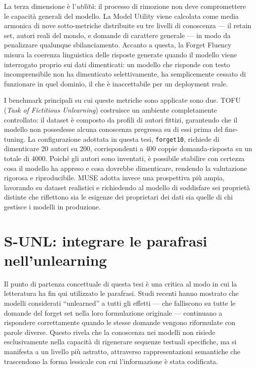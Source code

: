 \documentclass[12pt,a4paper]{article}
\begin{document}
La terza dimensione è l'\emph{utilità}: il processo di rimozione non deve compromettere le capacità generali del modello. La Model Utility viene calcolata come media armonica di nove sotto-metriche distribuite su tre livelli di conoscenza — il retain set, autori reali del mondo, e domande di carattere generale — in modo da penalizzare qualunque sbilanciamento. Accanto a questa, la Forget Fluency misura la coerenza linguistica delle risposte generate quando il modello viene interrogato proprio sui dati dimenticati: un modello che risponde con testo incomprensibile non ha dimenticato selettivamente, ha semplicemente cessato di funzionare in quel dominio, il che è inaccettabile per un deployment reale.

I benchmark principali su cui queste metriche sono applicate sono due. TOFU (\emph{Task of Fictitious Unlearning}) costruisce un ambiente completamente controllato: il dataset è composto da profili di autori fittizi, garantendo che il modello non possedesse alcuna conoscenza pregressa su di essi prima del fine-tuning. La configurazione adottata in questa tesi, \texttt{forget10}, richiede di dimenticare 20 autori su 200, corrispondenti a 400 coppie domanda-risposta su un totale di 4000. Poiché gli autori sono inventati, è possibile stabilire con certezza cosa il modello ha appreso e cosa dovrebbe dimenticare, rendendo la valutazione rigorosa e riproducibile. MUSE adotta invece una prospettiva più ampia, lavorando su dataset realistici e richiedendo al modello di soddisfare sei proprietà distinte che riflettono sia le esigenze dei proprietari dei dati sia quelle di chi gestisce i modelli in produzione.

\section{S-UNL: integrare le parafrasi nell'unlearning}

Il punto di partenza concettuale di questa tesi è una critica al modo in cui la letteratura ha fin qui utilizzato le parafrasi. Studi recenti hanno mostrato che modelli considerati ``unlearned'' a tutti gli effetti — che falliscono su tutte le domande del forget set nella loro formulazione originale — continuano a rispondere correttamente quando le stesse domande vengono riformulate con parole diverse. Questo rivela che la conoscenza nei modelli non risiede esclusivamente nella capacità di rigenerare sequenze testuali specifiche, ma si manifesta a un livello più astratto, attraverso rappresentazioni semantiche che trascendono la forma lessicale con cui l'informazione è stata codificata.
\end{document}
